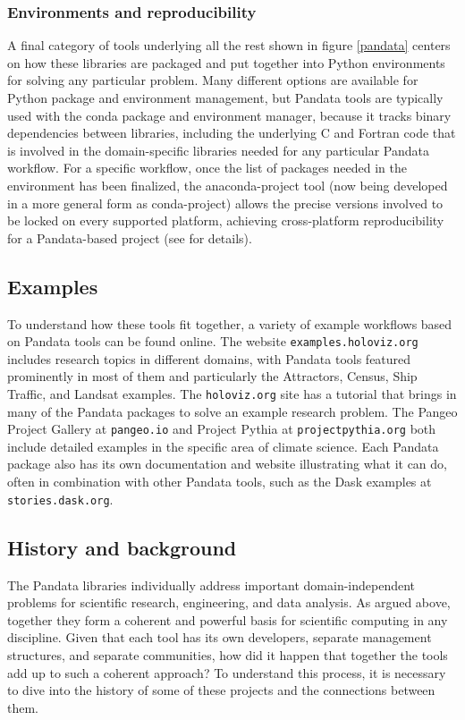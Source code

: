 \subsubsection{Environments and reproducibility}

A final category of tools underlying all the rest shown in figure \ref{pandata} centers on how these libraries are packaged and put together into Python environments for solving any particular problem. Many different options are available for Python package and environment management, but Pandata tools are typically used with the conda package and environment manager, because it tracks binary dependencies between libraries, including the underlying C and Fortran code that is involved in the domain-specific libraries needed for any particular Pandata workflow. For a specific workflow, once the list of packages needed in the environment has been finalized, the anaconda-project tool (now being developed in a more general form as conda-project) allows the precise versions involved to be locked on every supported platform, achieving cross-platform reproducibility for a Pandata-based project (see
\cite{bednar:anaconda22} for details).


\subsection{Examples}

To understand how these tools fit together, a variety of example workflows based on Pandata tools can be found online. The website \texttt{examples.holoviz.org} includes research topics in different domains, with Pandata tools featured prominently in most of them and particularly the Attractors, Census, Ship Traffic, and Landsat examples. The \texttt{holoviz.org} site has a tutorial that brings in many of the Pandata packages to solve an example research problem. The Pangeo Project Gallery at \texttt{pangeo.io} and Project Pythia at \texttt{projectpythia.org} both include detailed examples in the specific area of climate science. Each Pandata package also has its own documentation and website illustrating what it can do, often in combination with other Pandata tools, such as the Dask examples at \texttt{stories.dask.org}.

\subsection{History and background}

The Pandata libraries individually address important domain-independent problems for scientific research, engineering, and data analysis. As argued above, together they form a coherent and powerful basis for scientific computing in any discipline. Given that each tool has its own developers, separate management structures, and separate communities, how did it happen that together the tools add up to such a coherent approach? To understand this process, it is necessary to dive into the history of some of these projects and the connections between them.

